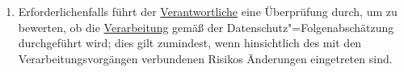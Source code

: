 \begin{enumerate}
  \item Erforderlichenfalls führt der \hyperref[itm:04-7]{Verantwortliche} eine Überprüfung durch, um zu bewerten, ob
   die \hyperref[itm:04-2]{Verarbeitung} gemäß der Datenschutz"=Folgenabschätzung durchgeführt wird; dies gilt
   zumindest, wenn hinsichtlich des mit den Verarbeitungsvorgängen verbundenen Risikos Änderungen eingetreten sind.%
  \label{itm:35-11}

\end{enumerate}


